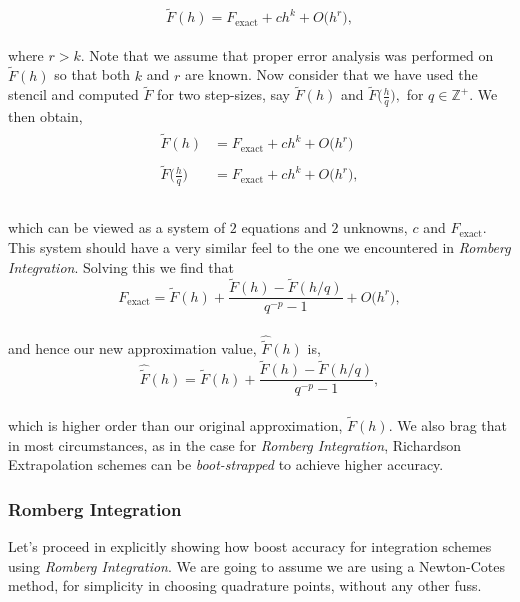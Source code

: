 \documentclass[paper=a4, fontsize=11pt]{scrartcl} %
\numberwithin{equation}{section} %
\numberwithin{figure}{section} %
\numberwithin{table}{section} %
\begin{document}
 $$\tilde{F}(h) = F_{\mbox{exact}} + ch^{k} + O\big(h^{r}\big),$$\\
 
 where $r>k$. Note that we assume that proper error analysis was performed on $\tilde{F}(h)$ so that both $k$ and $r$ are known. Now consider that we have used the stencil and computed $\tilde{F}$ for two step-sizes, say $\tilde{F}(h)$ and $\tilde{F}\big(\frac{h}{q}\big),$ for $q\in\mathbb{Z}^+.$ We then obtain,\\
 
 \begin{align}
 \nonumber
 \begin{split}
 \tilde{F}(h) &= F_{\mbox{exact}} + ch^{k} + O\big(h^{r}\big) \\  \\
 \tilde{F}\Bigg(\frac{h}{q}\Bigg) &= F_{\mbox{exact}} + ch^{k} + O\big(h^{r}\big), \\ \\
 \end{split}
 \end{align}
 
 which can be viewed as a system of $2$ equations and $2$ unknowns, $c$ and $F_{\mbox{exact}}.$ This system should have a very similar feel to the one we encountered in \emph{Romberg Integration}. Solving this we find that\\
 
 $$F_{\mbox{exact}} = \tilde{F}(h) + \frac{ \tilde{F}(h) - \tilde{F}(h/q) }{ q^{-p} - 1} + O\big(h^r\big),$$ \\
 
 and hence our new approximation value, $\hat{\tilde{F}}(h)$ is,\\
 
 $$\hat{\tilde{F}}(h) =  \tilde{F}(h) + \frac{ \tilde{F}(h) - \tilde{F}(h/q) }{ q^{-p} - 1},$$\\
 
 which is higher order than our original approximation, $\tilde{F}(h)$. We also brag that in most circumstances, as in the case for \emph{Romberg Integration}, Richardson Extrapolation schemes can be \emph{boot-strapped} to achieve higher accuracy.
 
 \subsubsection{Romberg Integration}
 
 Let's proceed in explicitly showing how boost accuracy for integration schemes using \emph{Romberg Integration}. We are going to assume we are using a Newton-Cotes method, for simplicity in choosing quadrature points, without any other fuss. 
 
\end{document}
